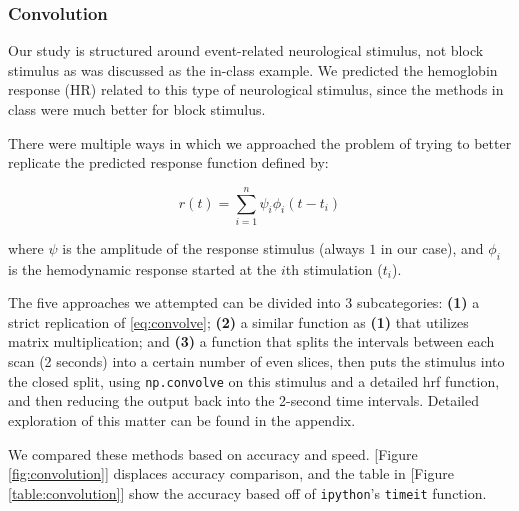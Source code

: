 \subsubsection{Convolution}
\par \indent Our study is structured around event-related neurological 
stimulus, not block stimulus as was discussed as the in-class example. We 
predicted the hemoglobin response (HR) related to this type of neurological 
stimulus, since the methods in class were much better for block stimulus. 

There were multiple ways in which we approached the problem of trying to 
better replicate the predicted response function defined by:

\begin{equation} \label{eq:convolve}
r(t)= \sum_{i=1}^n \psi_{i} \phi_{i}(t-t_i)
\end{equation}

where $\psi$ is the amplitude of the response stimulus (always $1$ in our 
case), and $\phi_{i}$ is the hemodynamic response started at the $i$th 
stimulation ($t_i$).

The five approaches we attempted can be divided into 3 subcategories: 
\textbf{(1)} a strict replication of \ref{eq:convolve}; \textbf{(2)} a similar 
function as \textbf{(1)} that utilizes matrix multiplication; and \textbf{(3)} a 
function that splits the intervals between each scan (2 seconds) into a certain 
number of even slices, then puts the stimulus into the closed split, using 
\texttt{np.convolve} on this stimulus and a detailed hrf function, and then 
reducing the output back into the 2-second time intervals. Detailed exploration 
of this matter can be found in the appendix.

We compared these methods based on accuracy and speed. [Figure 
\ref{fig:convolution}] displaces accuracy comparison, and the table in [Figure 
\ref{table:convolution}] show the accuracy based off of \texttt{ipython}'s 
\texttt{timeit} function.




